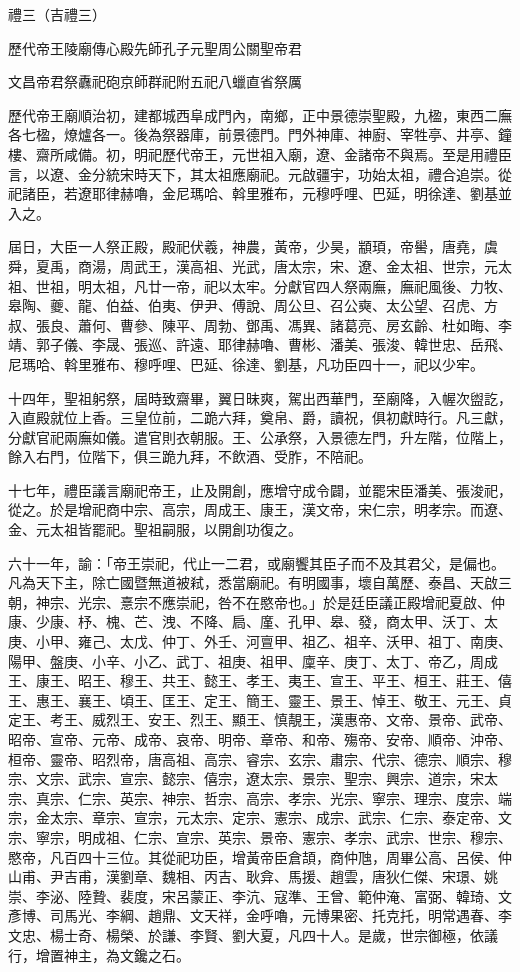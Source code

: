 
\begin{pinyinscope}
禮三（吉禮三）

歷代帝王陵廟傳心殿先師孔子元聖周公關聖帝君

文昌帝君祭纛祀砲京師群祀附五祀八蠟直省祭厲

歷代帝王廟順治初，建都城西阜成門內，南鄉，正中景德崇聖殿，九楹，東西二廡各七楹，燎爐各一。後為祭器庫，前景德門。門外神庫、神廚、宰牲亭、井亭、鐘樓、齋所咸備。初，明祀歷代帝王，元世祖入廟，遼、金諸帝不與焉。至是用禮臣言，以遼、金分統宋時天下，其太祖應廟祀。元啟疆宇，功始太祖，禮合追崇。從祀諸臣，若遼耶律赫嚕，金尼瑪哈、斡里雅布，元穆呼哩、巴延，明徐達、劉基並入之。

屆日，大臣一人祭正殿，殿祀伏羲，神農，黃帝，少昊，顓頊，帝嚳，唐堯，虞舜，夏禹，商湯，周武王，漢高祖、光武，唐太宗，宋、遼、金太祖、世宗，元太祖、世祖，明太祖，凡廿一帝，祀以太牢。分獻官四人祭兩廡，廡祀風後、力牧、皋陶、夔、龍、伯益、伯夷、伊尹、傅說、周公旦、召公奭、太公望、召虎、方叔、張良、蕭何、曹參、陳平、周勃、鄧禹、馮異、諸葛亮、房玄齡、杜如晦、李靖、郭子儀、李晟、張巡、許遠、耶律赫嚕、曹彬、潘美、張浚、韓世忠、岳飛、尼瑪哈、斡里雅布、穆呼哩、巴延、徐達、劉基，凡功臣四十一，祀以少牢。

十四年，聖祖躬祭，屆時致齋畢，翼日昧爽，駕出西華門，至廟降，入幄次盥訖，入直殿就位上香。三皇位前，二跪六拜，奠帛、爵，讀祝，俱初獻時行。凡三獻，分獻官祀兩廡如儀。遣官則衣朝服。王、公承祭，入景德左門，升左階，位階上，餘入右門，位階下，俱三跪九拜，不飲酒、受胙，不陪祀。

十七年，禮臣議言廟祀帝王，止及開創，應增守成令闢，並罷宋臣潘美、張浚祀，從之。於是增祀商中宗、高宗，周成王、康王，漢文帝，宋仁宗，明孝宗。而遼、金、元太祖皆罷祀。聖祖嗣服，以開創功復之。

六十一年，諭：「帝王崇祀，代止一二君，或廟饗其臣子而不及其君父，是偏也。凡為天下主，除亡國暨無道被弒，悉當廟祀。有明國事，壞自萬歷、泰昌、天啟三朝，神宗、光宗、憙宗不應崇祀，咎不在愍帝也。」於是廷臣議正殿增祀夏啟、仲康、少康、杼、槐、芒、洩、不降、扃、廑、孔甲、皋、發，商太甲、沃丁、太庚、小甲、雍己、太戊、仲丁、外壬、河亶甲、祖乙、祖辛、沃甲、祖丁、南庚、陽甲、盤庚、小辛、小乙、武丁、祖庚、祖甲、廩辛、庚丁、太丁、帝乙，周成王、康王、昭王、穆王、共王、懿王、孝王、夷王、宣王、平王、桓王、莊王、僖王、惠王、襄王、頃王、匡王、定王、簡王、靈王、景王、悼王、敬王、元王、貞定王、考王、威烈王、安王、烈王、顯王、慎靚王，漢惠帝、文帝、景帝、武帝、昭帝、宣帝、元帝、成帝、哀帝、明帝、章帝、和帝、殤帝、安帝、順帝、沖帝、桓帝、靈帝、昭烈帝，唐高祖、高宗、睿宗、玄宗、肅宗、代宗、德宗、順宗、穆宗、文宗、武宗、宣宗、懿宗、僖宗，遼太宗、景宗、聖宗、興宗、道宗，宋太宗、真宗、仁宗、英宗、神宗、哲宗、高宗、孝宗、光宗、寧宗、理宗、度宗、端宗，金太宗、章宗、宣宗，元太宗、定宗、憲宗、成宗、武宗、仁宗、泰定帝、文宗、寧宗，明成祖、仁宗、宣宗、英宗、景帝、憲宗、孝宗、武宗、世宗、穆宗、愍帝，凡百四十三位。其從祀功臣，增黃帝臣倉頡，商仲虺，周畢公高、呂侯、仲山甫、尹吉甫，漢劉章、魏相、丙吉、耿弇、馬援、趙雲，唐狄仁傑、宋璟、姚崇、李泌、陸贄、裴度，宋呂蒙正、李沆、寇準、王曾、範仲淹、富弼、韓琦、文彥博、司馬光、李綱、趙鼎、文天祥，金呼嚕，元博果密、托克托，明常遇春、李文忠、楊士奇、楊榮、於謙、李賢、劉大夏，凡四十人。是歲，世宗御極，依議行，增置神主，為文鑱之石。


\end{pinyinscope}
